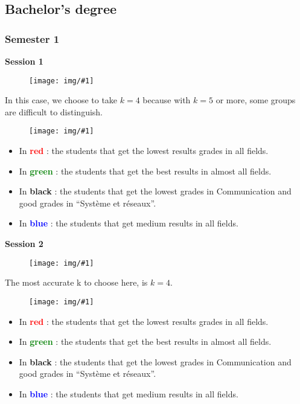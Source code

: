 \documentclass[11pt, a4paper]{article}
\newcommand\image[2]{
	\begin{figure}[H]
	\centering
	\texttt{[image: img/\#1]}
	\end{figure}
}
\begin{document}
    \newpage

    \subsection{Bachelor's degree}

    \subsubsection{Semester 1 } 
    \textbf{\large{Session 1}}

    \image{image22.png}{380px}

    In this case, we choose to take $k=4$ because with $k=5$ or more, some groups are difficult to distinguish.

    \image{image00.png}{500px}

    \begin{multicols}{2}
        \begin{itemize}
            \item In \textbf{\textcolor{red}{red}} : the students that get the lowest results grades in all fields.
            \item In \textbf{\textcolor{green}{green}} : the students that get the best results in almost all fields.\\
            \item In \textbf{black} : the students that get the lowest grades in Communication and good grades in “Système et réseaux”.
            \item In \textbf{\textcolor{blue}{blue}} : the students that get medium results in all fields.
        \end{itemize}
    \end{multicols}


    \textbf{\large{Session 2}}

    \image{image24.png}{380px} 

    The most accurate k to choose here, is $k=4$.
    
    \image{image25.png}{500px}

    \begin{multicols}{2}
        \begin{itemize}
            \item In \textbf{\textcolor{red}{red}} : the students that get the lowest results grades in all fields.
            \item In \textbf{\textcolor{green}{green}} : the students that get the best results in almost all fields.\\
            \item In \textbf{black} : the students that get the lowest grades in Communication and good grades in “Système et réseaux”.
            \item In \textbf{\textcolor{blue}{blue}} : the students that get medium results in all fields.
        \end{itemize}
    \end{multicols}
\end{document}
